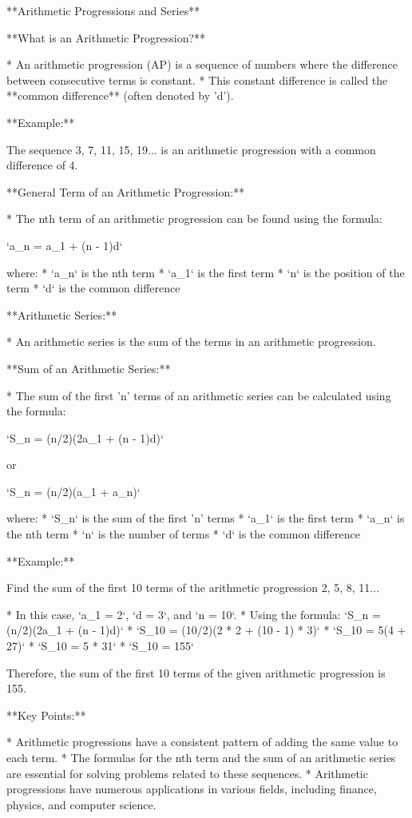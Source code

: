 **Arithmetic Progressions and Series**

**What is an Arithmetic Progression?**

* An arithmetic progression (AP) is a sequence of numbers where the difference between consecutive terms is constant. 
* This constant difference is called the **common difference** (often denoted by 'd').

**Example:**

The sequence 3, 7, 11, 15, 19... is an arithmetic progression with a common difference of 4.

**General Term of an Arithmetic Progression:**

* The nth term of an arithmetic progression can be found using the formula:

  `a_n = a_1 + (n - 1)d`

  where:
    * `a_n` is the nth term
    * `a_1` is the first term
    * `n` is the position of the term
    * `d` is the common difference

**Arithmetic Series:**

* An arithmetic series is the sum of the terms in an arithmetic progression.

**Sum of an Arithmetic Series:**

* The sum of the first 'n' terms of an arithmetic series can be calculated using the formula:

  `S_n = (n/2)(2a_1 + (n - 1)d)`

  or

  `S_n = (n/2)(a_1 + a_n)`

  where:
    * `S_n` is the sum of the first 'n' terms
    * `a_1` is the first term
    * `a_n` is the nth term
    * `n` is the number of terms
    * `d` is the common difference

**Example:**

Find the sum of the first 10 terms of the arithmetic progression 2, 5, 8, 11...

* In this case, `a_1 = 2`, `d = 3`, and `n = 10`.
* Using the formula: `S_n = (n/2)(2a_1 + (n - 1)d)`
* `S_10 = (10/2)(2 * 2 + (10 - 1) * 3)`
* `S_10 = 5(4 + 27)`
* `S_10 = 5 * 31`
* `S_10 = 155`

Therefore, the sum of the first 10 terms of the given arithmetic progression is 155.

**Key Points:**

* Arithmetic progressions have a consistent pattern of adding the same value to each term.
* The formulas for the nth term and the sum of an arithmetic series are essential for solving problems related to these sequences.
* Arithmetic progressions have numerous applications in various fields, including finance, physics, and computer science.
